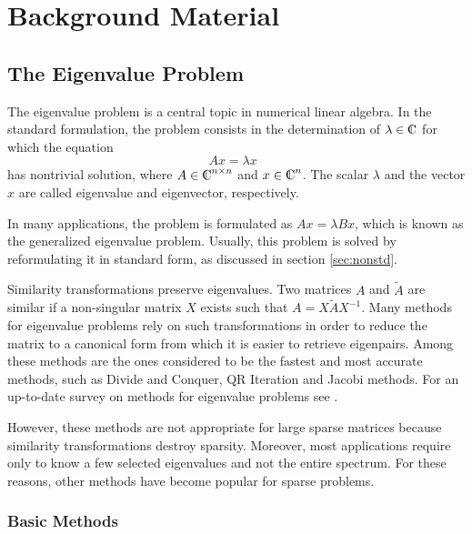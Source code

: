 \chapter{\label{cap:back}Background Material}

\section{The Eigenvalue Problem}
\label{sec:eig}

	The eigenvalue problem is a central topic in numerical linear algebra. In the standard formulation, the problem consists in the determination of $\lambda\in\Co$ for which the equation
\begin{equation}Ax=\lambda x\;\;\label{eq:eigstd}\end{equation}
has nontrivial solution, where $A\in\Co^{n\times n}$ and $x \in \Co^n$. The scalar $\lambda$ and the vector $x$ are called eigenvalue and eigenvector, respectively.

	In many applications, the problem is formulated as $Ax=\lambda Bx$, which is known as the generalized eigenvalue problem. Usually, this problem is solved by reformulating it in standard form, as discussed in section \ref{sec:nonstd}.

	Similarity transformations preserve eigenvalues. Two matrices $A$ and $\tilde{A}$ are similar if a non-singular matrix $X$ exists such that $A=X\tilde{A}X^{-1}$. Many methods for eigenvalue problems rely on such transformations in order to reduce the matrix to a canonical form from which it is easier to retrieve eigenpairs. Among these methods are the ones considered to be the fastest and most accurate methods, such as Divide and Conquer, QR Iteration and Jacobi methods. For an up-to-date survey on methods for eigenvalue problems see \citep{Golub:2000:EC2}.

	However, these methods are not appropriate for large sparse matrices because similarity transformations destroy sparsity. Moreover, most applications require only to know a few selected eigenvalues and not the entire spectrum. For these reasons, other methods have become popular for sparse problems. 

\subsection{Basic Methods}

